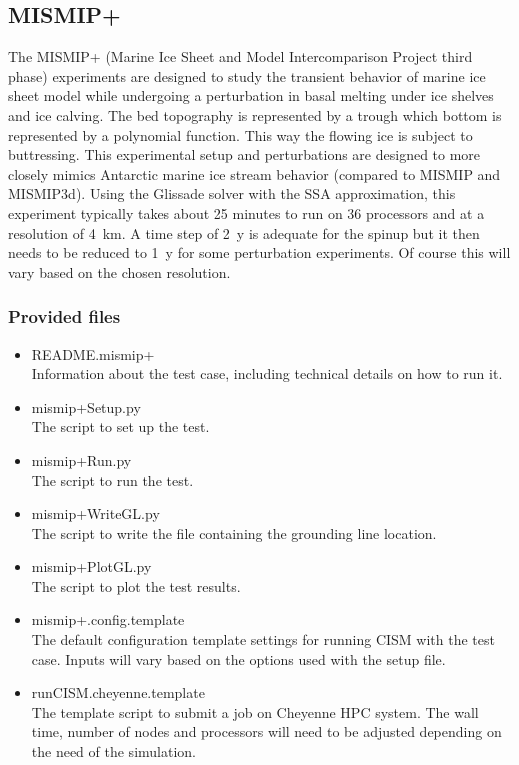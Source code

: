\subsection{MISMIP+}
\label{sc:misomip}
The MISMIP+ (Marine Ice Sheet and Model Intercomparison Project third phase) experiments \citep{AsayDavis2016} are designed to study the transient behavior of marine ice sheet model while undergoing a perturbation in basal melting under ice shelves and ice calving. The bed topography is represented by a trough which bottom is represented by a polynomial function. This way the flowing ice is subject to buttressing. This experimental setup and perturbations are designed to more closely mimics Antarctic marine ice stream behavior (compared to MISMIP and MISMIP3d).
Using the Glissade solver with the SSA approximation, this experiment typically takes about 25 minutes to run on 36 processors and at a resolution of 4~km. A time step of 2~y is adequate for the spinup but it then needs to be reduced to 1~y for some perturbation experiments. Of course this will vary based on the chosen resolution.


\subsubsection{Provided files}

\begin{itemize}
	\item README.mismip+ \\
		Information about the test case, including technical details on how to run it.
	\item mismip+Setup.py \\
		The script to set up the test.
	\item mismip+Run.py \\
		The script to run the test.
	\item mismip+WriteGL.py \\
		The script to write the file containing the grounding line location.
	\item mismip+PlotGL.py \\
		The script to plot the test results.		
	\item mismip+.config.template \\
		The default configuration template settings for running CISM with the test case. Inputs will vary based on the options used with the setup file. 
	\item runCISM.cheyenne.template \\
		The template script to submit a job on Cheyenne HPC system. The wall time, number of nodes and processors will need to be adjusted depending on the need of the simulation. 
\end{itemize}

